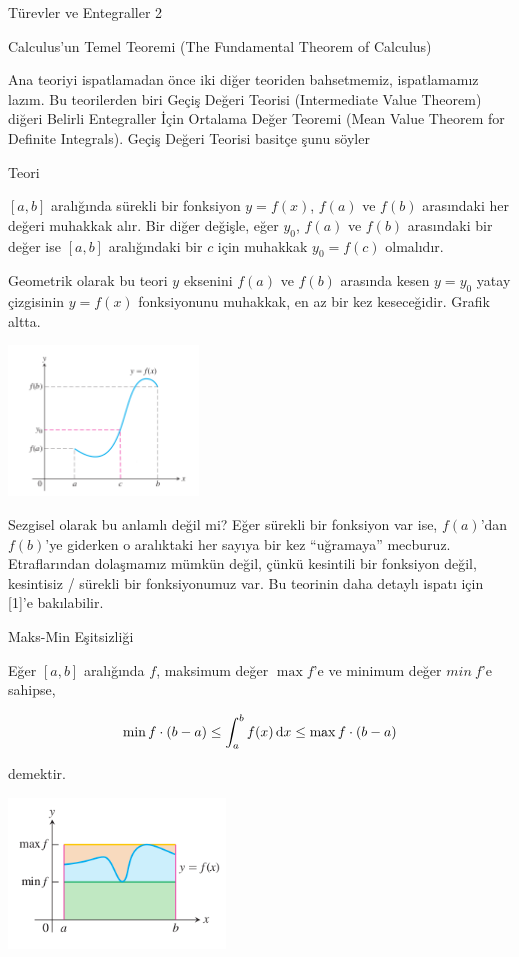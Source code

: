 \documentclass[12pt,fleqn]{article}\usepackage{../../common}
\begin{document}
Türevler ve Entegraller 2

Calculus'un Temel Teoremi (The Fundamental Theorem of Calculus)

Ana teoriyi ispatlamadan önce iki diğer teoriden bahsetmemiz, ispatlamamız
lazım. Bu teorilerden biri Geçiş Değeri Teorisi (Intermediate Value
Theorem) diğeri Belirli Entegraller İçin Ortalama Değer Teoremi (Mean Value
Theorem for Definite Integrals). Geçiş Değeri Teorisi basitçe şunu söyler

Teori

$[a,b]$ aralığında sürekli bir fonksiyon $y=f(x)$, $f(a)$ ve $f(b)$
arasındaki her değeri muhakkak alır. Bir diğer değişle, eğer $y_0$, $f(a)$
ve $f(b)$ arasındaki bir değer ise $[a,b]$ aralığındaki bir $c$ için
muhakkak $y_0 = f(c)$ olmalıdır. 

Geometrik olarak bu teori $y$ eksenini $f(a)$ ve $f(b)$ arasında kesen
$y=y_0$ yatay çizgisinin $y=f(x)$ fonksiyonunu muhakkak, en az bir kez
keseceğidir. Grafik altta. 

\includegraphics[height=4cm]{calc_multi_app_05.png}

Sezgisel olarak bu anlamlı değil mi? Eğer sürekli bir fonksiyon var ise,
$f(a)$'dan $f(b)$'ye giderken o aralıktaki her sayıya bir kez ``uğramaya''
mecburuz. Etraflarından dolaşmamız mümkün değil, çünkü kesintili bir
fonksiyon değil, kesintisiz / sürekli bir fonksiyonumuz var. Bu teorinin
daha detaylı ispatı için [1]'e bakılabilir. 

Maks-Min Eşitsizliği

Eğer $[a,b]$ aralığında $f$, maksimum değer $\max f$'e ve minimum değer
$min \ f$'e sahipse, 

$$ \min f \cdot (b-a) \le \int_a^b f(x) \,\mathrm{d} x \le \max f \cdot (b-a) $$

demektir. 

\includegraphics[height=4cm]{calc_multi_app_08.png}
\end{document}
